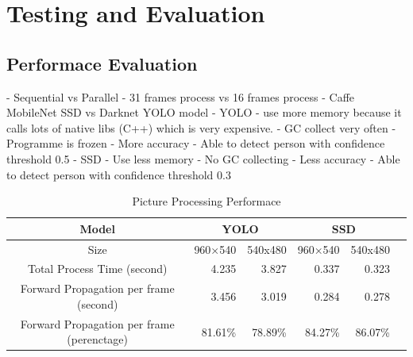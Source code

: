 \chapter{Testing and Evaluation}\label{testing}

    \section{Performace Evaluation}
        - Sequential vs Parallel
            -	31 frames process vs 16 frames process
            -	Caffe MobileNet SSD vs Darknet YOLO model
                - YOLO
                    - use more memory because it calls lots of native libs (C++) which is very expensive.
                        - GC collect very often
                        - Programme is frozen
                    - More accuracy
                        - Able to detect person with confidence threshold 0.5
                - SSD
                    - Use less memory
                        - No GC collecting
                    - Less accuracy
                        - Able to detect person with confidence threshold 0.3


        \begin{table}[!htp]\centering
            \scriptsize
            \begin{tabular}{lrrrrrr}\toprule
                \multicolumn{2}{c}{Model} &\multicolumn{2}{c}{YOLO} &\multicolumn{2}{c}{SSD} \\\midrule
                \multicolumn{2}{c}{Size} &960×540 &540x480 &960×540 &540x480 \\
                \multicolumn{2}{c}{Total Process Time (second)} &4.235 &3.827 &0.337 &0.323 \\
                \multicolumn{2}{c}{Forward Propagation per frame (second)} &3.456 &3.019 &0.284 &0.278 \\
                \multicolumn{2}{c}{Forward Propagation per frame (perenctage)} &81.61\% &78.89\% &84.27\% &86.07\% \\
                \bottomrule
            \end{tabular}

            \caption{Picture Processing Performace}\label{performance:picture}
        \end{table}

